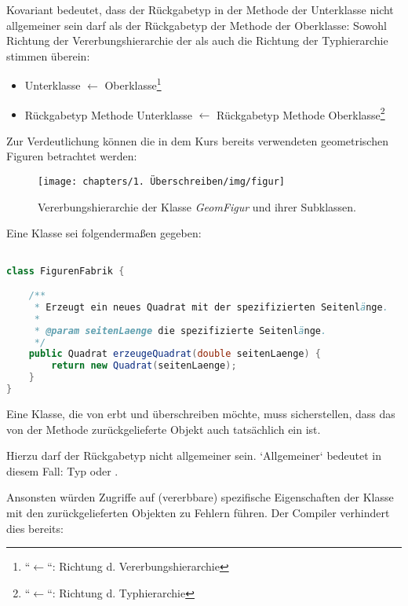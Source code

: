Kovariant bedeutet, dass der Rückgabetyp in der Methode der Unterklasse nicht allgemeiner sein darf als der Rückgabetyp der Methode der Oberklasse:
Sowohl Richtung der Vererbungshierarchie der als auch die Richtung der Typhierarchie stimmen überein:

\begin{itemize}
    \item Unterklasse $\leftarrow$ Oberklasse\footnote{
        ``$\leftarrow$``: Richtung d. Vererbungshierarchie
    }
    \item Rückgabetyp Methode Unterklasse $\leftarrow$ Rückgabetyp Methode Oberklasse\footnote{
        ``$\leftarrow$``: Richtung d. Typhierarchie
    }
\end{itemize}

Zur Verdeutlichung können die in dem Kurs bereits verwendeten geometrischen Figuren betrachtet werden:

\begin{figure}[h]
    \centering
    \texttt{[image: chapters/1. Überschreiben/img/figur]}
    \caption{Vererbungshierarchie der Klasse \textit{GeomFigur} und ihrer Subklassen.}
    \label{fig:figur}
\end{figure}

Eine Klasse  sei folgendermaßen gegeben:

\begin{lstlisting}[language=java]

class FigurenFabrik {

    /**
     * Erzeugt ein neues Quadrat mit der spezifizierten Seitenlänge.
     *
     * @param seitenLaenge die spezifizierte Seitenlänge.
     */
    public Quadrat erzeugeQuadrat(double seitenLaenge) {
        return new Quadrat(seitenLaenge);
    }
}
\end{lstlisting}

Eine Klasse, die von  erbt und  überschreiben möchte,
muss sicherstellen, dass das von der Methode zurückgelieferte Objekt auch tatsächlich ein  ist.

Hierzu darf der Rückgabetyp nicht allgemeiner sein. `Allgemeiner` bedeutet in diesem Fall: Typ  oder .

Ansonsten würden Zugriffe auf (vererbbare) spezifische Eigenschaften der Klasse  mit den zurückgelieferten Objekten zu Fehlern führen.
Der Compiler verhindert dies bereits:

